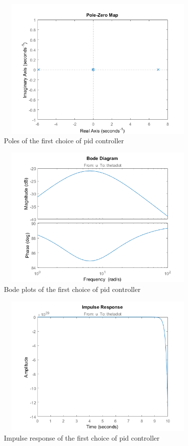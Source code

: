 \documentclass [12pt,letterpaper]{exam}
\begin{document}
\begin{figure}[H]
  \centering
    \includegraphics[width=10.15cm, height=7cm]{pid_poles} 
  \caption{Poles of the first choice of pid controller}
  \label{fig:pid_poles}
\end{figure}

\begin{figure}[H]
  \centering
    \includegraphics[width=10.15cm, height=7cm]{pid_bode} 
  \caption{Bode plots of the first choice of pid controller}
  \label{fig:pid_bode}
\end{figure}

\begin{figure}[H]
  \centering
    \includegraphics[width=10.15cm, height=7cm]{pid_impulse} 
  \caption{Impulse response of the first choice of pid controller}
  \label{fig:pid_impulse}
\end{figure}
\end{document}

